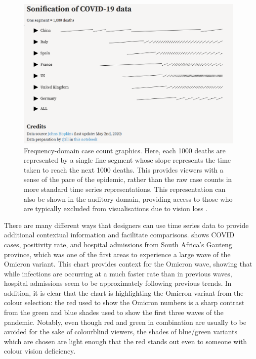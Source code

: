 \documentclass[article]{jdssv}\usepackage[]{graphicx}\usepackage[]{color}
\begin{document}
\begin{figure}
\centering
\includegraphics[width=.75\linewidth]{frequency-domain}
\caption{Frequency-domain case count graphics. Here, each 1000 deaths are represented by a single line segment whose slope represents the time taken to reach the next 1000 deaths. This provides viewers with a sense of the pace of the epidemic, rather than the raw case counts in more standard time series representations. This representation can also be shown in the auditory domain, providing access to those who are typically excluded from visualisations due to vision loss \citep{vuillemotSonificationCOVID19Data2020}.}
\label{fig:freq-domain}
\end{figure}

There are many different ways that designers can use time series data to provide additional contextual information and facilitate comparisons.  shows COVID cases, positivity rate, and hospital admissions from South Africa's Gauteng province, which was one of the first areas to experience a large wave of the Omicron variant. This chart provides context for the Omicron wave, showing that while infections are occurring at a much faster rate than in previous waves, hospital admissions seem to be approximately following previous trends. In addition, it is clear that the chart is highlighting the Omicron variant from the colour selection: the red used to show the Omicron numbers is a sharp contrast from the green and blue shades used to show the first three waves of the pandemic. Notably, even though red and green in combination are usually to be avoided for the sake of colourblind viewers, the shades of blue/green variants which are chosen are light enough that the red stands out even to someone with colour vision deficiency.
\end{document}
